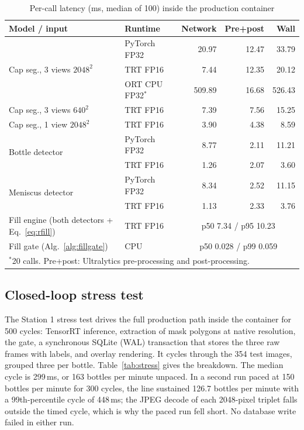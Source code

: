 \begin{table}[htbp]
\centering
\caption{Per-call latency (ms, median of 100) inside the production container}
\label{tab:latency}
\small
\begin{tabular}{|l|l|r|r|r|}
\hline
\textbf{Model / input} & \textbf{Runtime} & \textbf{Network} & \textbf{Pre+post} & \textbf{Wall} \\ \hline
\multirow{3}{*}{Cap seg., 3 views $2048^2$} & PyTorch FP32 & 20.97 & 12.47 & 33.79 \\ \cline{2-5}
 & TRT FP16 & 7.44 & 12.35 & 20.12 \\ \cline{2-5}
 & ORT CPU FP32$^{*}$ & 509.89 & 16.68 & 526.43 \\ \hline
Cap seg., 3 views $640^2$ & TRT FP16 & 7.39 & 7.56 & 15.25 \\ \hline
Cap seg., 1 view $2048^2$ & TRT FP16 & 3.90 & 4.38 & 8.59 \\ \hline
\multirow{2}{*}{Bottle detector} & PyTorch FP32 & 8.77 & 2.11 & 11.21 \\ \cline{2-5}
 & TRT FP16 & 1.26 & 2.07 & 3.60 \\ \hline
\multirow{2}{*}{Meniscus detector} & PyTorch FP32 & 8.34 & 2.52 & 11.15 \\ \cline{2-5}
 & TRT FP16 & 1.13 & 2.33 & 3.76 \\ \hline
Fill engine (both detectors + Eq.~\eqref{eq:rfill}) & TRT FP16 & \multicolumn{3}{c|}{p50 7.34 / p95 10.23} \\ \hline
Fill gate (Alg.~\ref{alg:fillgate}) & CPU & \multicolumn{3}{c|}{p50 0.028 / p99 0.059} \\ \hline
\multicolumn{5}{l}{\small $^{*}$20 calls. Pre+post: Ultralytics pre-processing and post-processing.}
\end{tabular}
\end{table}

\subsection{Closed-loop stress test}
The Station 1 stress test drives the full production path inside the container for 500 cycles: TensorRT inference, extraction of mask polygons at native resolution, the gate, a synchronous SQLite (WAL) transaction that stores the three raw frames with labels, and overlay rendering. It cycles through the 354 test images, grouped three per bottle. Table~\ref{tab:stress} gives the breakdown. The median cycle is 299\,ms, or 163 bottles per minute unpaced. In a second run paced at 150 bottles per minute for 300 cycles, the line sustained 126.7 bottles per minute with a 99th-percentile cycle of 448\,ms; the JPEG decode of each 2048-pixel triplet falls outside the timed cycle, which is why the paced run fell short. No database write failed in either run.

